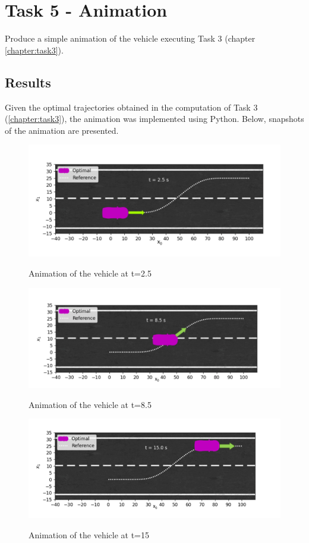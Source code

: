 \documentclass[a4paper,11pt,oneside]{book}
\begin{document}
\newpage
\chapter{Task 5 - Animation}

Produce a simple animation of the vehicle executing Task 3 (chapter \ref{chapter:task3}).

\section{Results}
Given the optimal trajectories obtained in the computation of Task 3 (\ref{chapter:task3}), the animation was implemented using Python. Below, snapshots of the animation are presented.
\begin{figure}[h]
    \centering
    \includegraphics[scale=.60]{figs/Task5/Vehicle_2.5s} \\
    \caption{Animation of the vehicle at t=2.5}
    \label{fig:enter-label}
\end{figure}

\begin{figure}[h]
    \centering
    \includegraphics[scale=.60]{figs/Task5/Vehicle_8.5s} \\
    \caption{Animation of the vehicle at t=8.5}
    \label{fig:enter-label}
\end{figure}
\begin{figure}[h]
    \centering
    \includegraphics[scale=.90]{figs/Task5/Vehicle_15s} \\
    \caption{Animation of the vehicle at t=15}
    \label{fig:enter-label}
\end{figure}
\end{document}
